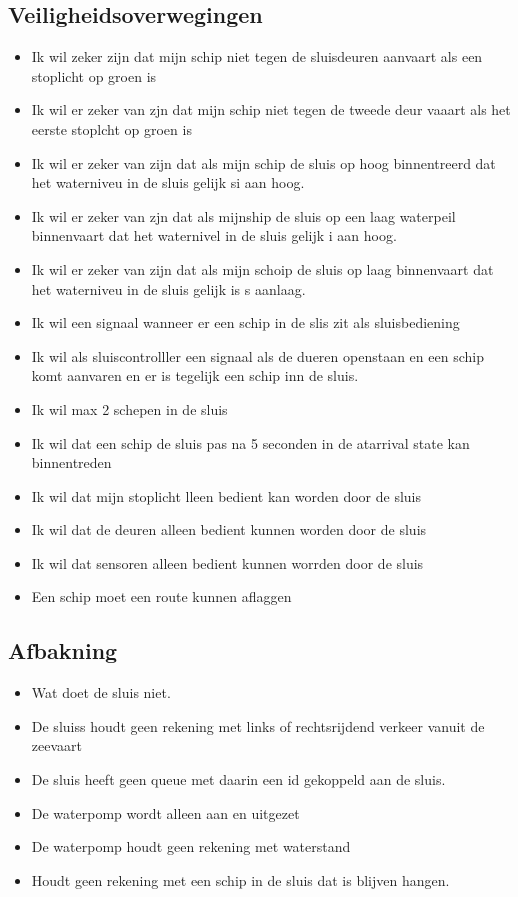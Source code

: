 \subsection{Veiligheidsoverwegingen}
\begin{itemize}
	\item Ik wil zeker zijn dat mijn schip niet tegen de sluisdeuren aanvaart als een stoplicht op groen is
	\item  Ik wil er zeker van zjn dat mijn schip niet tegen de tweede deur vaaart als het eerste stoplcht op groen is
	\item  Ik wil er zeker van zijn dat als mijn schip de sluis op hoog binnentreerd dat het waterniveu in de sluis gelijk si aan hoog.
	\item  Ik wil er zeker van zjn dat als mijnship de sluis op een laag waterpeil binnenvaart dat het waternivel in de sluis gelijk i aan hoog.
	\item  Ik wil er zeker van zijn dat als mijn schoip de sluis op laag binnenvaart dat het waterniveu in de sluis gelijk is s aanlaag.
	\item  Ik wil een signaal wanneer er een schip in de slis zit als sluisbediening
	\item  Ik wil als sluiscontrolller een signaal als de dueren openstaan en een schip komt aanvaren en er is tegelijk een schip inn de sluis.
	\item  Ik wil max 2 schepen in de sluis
	\item  Ik wil dat een schip de sluis pas na 5 seconden in de  atarrival state kan binnentreden
	\item  Ik wil dat mijn stoplicht lleen bedient kan worden door de sluis
	\item  Ik wil dat de deuren alleen bedient kunnen worden door de sluis
	\item  Ik wil dat sensoren alleen bedient kunnen worrden door de sluis
	\item  Een schip moet een route kunnen aflaggen 
\end{itemize}
 
 


\subsection{Afbakning}
\begin{itemize}
	\item Wat doet de sluis niet.
	\item De sluiss houdt geen rekening met links of rechtsrijdend verkeer vanuit de zeevaart
	\item De sluis heeft geen queue met daarin een id gekoppeld aan de sluis.
	\item De waterpomp wordt alleen aan en uitgezet
	\item De waterpomp houdt geen rekening met waterstand
	\item Houdt geen rekening met een schip in de sluis dat is blijven hangen.
	
\end{itemize}


